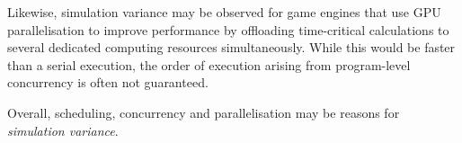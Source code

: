 \documentclass[letterpaper, 10 pt, journal, twoside]{IEEEtran}
\begin{document}
Likewise, simulation variance may be observed for game engines that use GPU parallelisation to improve performance by offloading time-critical calculations to several dedicated computing resources simultaneously. While this would be faster than a serial execution, the order of execution arising from program-level concurrency is often not guaranteed. 

Overall, scheduling, concurrency and parallelisation may be reasons for \textit{simulation variance}. 
\\\\
%
%
%
\end{document}
